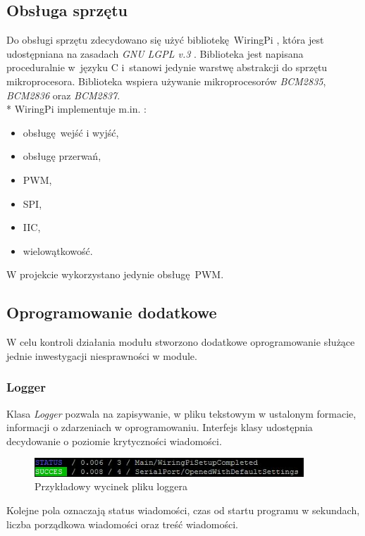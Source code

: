 \documentclass[12pt, eng, twoside, openany, final]{mgr}
\begin{document}
                \subsection{Obsługa sprzętu}
                Do obsługi sprzętu zdecydowano się użyć bibliotekę WiringPi \cite{wiringPi}, która jest udostępniana na zasadach \emph{GNU LGPL v.3 }. Biblioteka jest napisana proceduralnie w~języku C i~stanowi jedynie warstwę abstrakcji do sprzętu mikroprocesora. Biblioteka wspiera używanie mikroprocesorów \emph{BCM2835}, \emph{BCM2836} oraz  \emph{BCM2837}. \\*
                WiringPi implementuje m.in. : 
                \begin{itemize}
                    \item obsługę wejść i wyjść,
                    \item obsługę przerwań,
                    \item PWM,
                    \item SPI,
                    \item IIC,
                    \item wielowątkowość.
                \end{itemize}
                W projekcie wykorzystano jedynie obsługę PWM.
                
                \subsection{Oprogramowanie dodatkowe}
                W celu kontroli działania modułu stworzono dodatkowe oprogramowanie służące jednie inwestygacji niesprawności w module.
                \subsubsection{Logger}
                Klasa \emph{Logger} pozwala na zapisywanie, w pliku tekstowym w ustalonym formacie, informacji o zdarzeniach w oprogramowaniu.  Interfejs klasy udostępnia decydowanie o poziomie krytyczności wiadomości.
                    \begin{figure}[H]
                    \begin{center}
                        \includegraphics[width=0.9\textwidth]{logger.jpg}
                        \caption{Przykładowy wycinek pliku loggera}
                    \end{center}
                    \end{figure}
                \noindent Kolejne pola oznaczają status wiadomości, czas od startu programu w sekundach, liczba porządkowa wiadomości oraz treść wiadomości.
                
\end{document}
